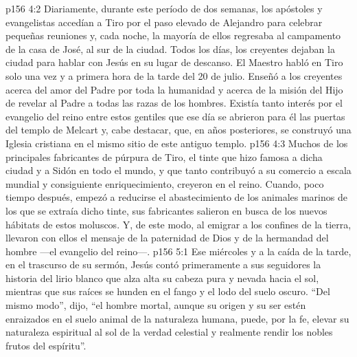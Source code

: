 \vs p156 4:2 Diariamente, durante este período de dos semanas, los apóstoles y evangelistas accedían a Tiro por el paso elevado de Alejandro para celebrar pequeñas reuniones y, cada noche, la mayoría de ellos regresaba al campamento de la casa de José, al sur de la ciudad. Todos los días, los creyentes dejaban la ciudad para hablar con Jesús en su lugar de descanso. El Maestro habló en Tiro solo una vez y a primera hora de la tarde del 20 de julio. Enseñó a los creyentes acerca del amor del Padre por toda la humanidad y acerca de la misión del Hijo de revelar al Padre a todas las razas de los hombres. Existía tanto interés por el evangelio del reino entre estos gentiles que ese día se abrieron para él las puertas del templo de Melcart y, cabe destacar, que, en años posteriores, se construyó una Iglesia cristiana en el mismo sitio de este antiguo templo.
\vs p156 4:3 Muchos de los principales fabricantes de púrpura de Tiro, el tinte que hizo famosa a dicha ciudad y a Sidón en todo el mundo, y que tanto contribuyó a su comercio a escala mundial y consiguiente enriquecimiento, creyeron en el reino. Cuando, poco tiempo después, empezó a reducirse el abastecimiento de los animales marinos de los que se extraía dicho tinte, sus fabricantes salieron en busca de los nuevos hábitats de estos moluscos. Y, de este modo, al emigrar a los confines de la tierra, llevaron con ellos el mensaje de la paternidad de Dios y de la hermandad del hombre ---el evangelio del reino---.
\vs p156 5:1 Ese miércoles y a la caída de la tarde, en el trascurso de su sermón, Jesús contó primeramente a sus seguidores la historia del lirio blanco que alza alta su cabeza pura y nevada hacia el sol, mientras que sus raíces se hunden en el fango y el lodo del suelo oscuro. “Del mismo modo”, dijo, “el hombre mortal, aunque su origen y su ser estén enraizados en el suelo animal de la naturaleza humana, puede, por la fe, elevar su naturaleza espiritual al sol de la verdad celestial y realmente rendir los nobles frutos del espíritu”.
